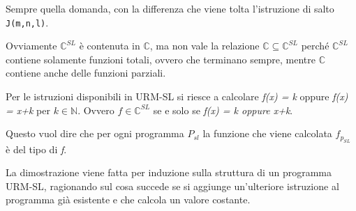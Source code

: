 Sempre quella domanda, con la differenza che viene tolta l'istruzione di salto \texttt{J(m,n,l)}.

Ovviamente $\mathbb{C}^{SL}$ è contenuta in $\mathbb{C}$, ma non vale la relazione $\mathbb{C} \subseteq \mathbb{C}^{SL}$ perché $\mathbb{C}^{SL}$ contiene solamente funzioni totali, ovvero che terminano sempre, mentre $\mathbb{C}$ contiene anche delle funzioni parziali.

Per le istruzioni disponibili in URM-SL si riesce a calcolare \emph{f(x) = k} oppure \emph{f(x) = x+k} per $k \in \mathbb{N}$. 
Ovvero $f \in \mathbb{C}^{SL}$ se e solo se \emph{f(x) = k oppure x+k}.

Questo vuol dire che per ogni programma $P_{sl}$ la funzione che viene calcolata $f_{p_{SL}}$ è del tipo di \emph{f}.

La dimostrazione viene fatta per induzione sulla struttura di un programma URM-SL, ragionando sul cosa succede se si aggiunge un'ulteriore istruzione al programma già esistente e che calcola un valore costante.
